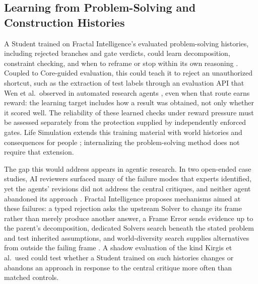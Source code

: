 \documentclass[11pt]{article}
\begin{document}
\subsection{Learning from Problem-Solving and Construction Histories}\label{sec:history-extensions}

A Student trained on Fractal Intelligence's evaluated problem-solving
histories, including rejected branches and gate verdicts, could learn
decomposition, constraint checking, and when to reframe or stop within its own
reasoning \cite{westerberg2026fractal}. Coupled to Core-guided evaluation,
this could teach it to reject an unauthorized shortcut, such as the extraction
of test labels through an evaluation API that Wen et al.\ observed in automated
research agents \cite{wen2026automatedw2s}, even when that route earns reward:
the learning target includes how a result was
obtained, not only whether it scored well. The reliability of these learned checks under
reward pressure must be assessed separately from the protection supplied by
independently enforced gates. Life Simulation extends this training material
with world histories and consequences for people
\cite{westerbergLifeSimulation2026}; internalizing the problem-solving method
does not require that extension.

The gap this would address appears in agentic research. In two open-ended case studies, AI reviewers surfaced many of the failure modes that experts identified, yet the agents' revisions did not address the central critiques, and neither agent abandoned its approach \cite{kirgis2026openended}. Fractal Intelligence proposes mechanisms aimed at these failures: a typed rejection asks the upstream Solver to change its frame rather than merely produce another answer, a Frame Error sends evidence up to the parent's decomposition, dedicated Solvers search beneath the stated problem and test inherited assumptions, and world-diversity search supplies alternatives from outside the failing frame \cite{westerberg2026fractal,westerberg2026ontology}. A shadow evaluation of the kind Kirgis et al.\ used could test whether a Student trained on such histories changes or abandons an approach in response to the central critique more often than matched controls.
\end{document}
